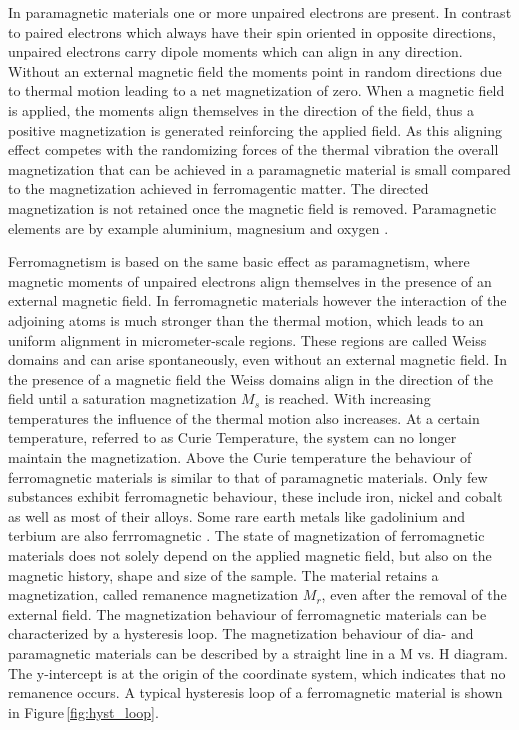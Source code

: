 In paramagnetic materials one or more unpaired electrons are present. In contrast to paired electrons which always have their spin oriented in opposite directions, unpaired electrons carry dipole moments which can align in any direction. Without an external magnetic field the moments point in random directions due to thermal motion leading to a net magnetization of zero. When a magnetic field is applied, the moments align themselves in the direction of the field, thus a positive magnetization is generated reinforcing the applied field. As this aligning effect competes with the randomizing forces of the thermal vibration the overall magnetization that can be achieved in a paramagnetic material is small compared to the magnetization achieved in ferromagentic matter. The directed magnetization is not retained once the magnetic field is removed. Paramagnetic elements are by example aluminium, magnesium and oxygen \cite{svoboda2004magnetic,griffiths2011elektrodynamik}.

Ferromagnetism is based on the same basic effect as paramagnetism, where magnetic moments of unpaired electrons align themselves in the presence of an external magnetic field. In ferromagnetic materials however the interaction of the adjoining atoms is much stronger than the thermal motion, which leads to an uniform alignment in micrometer-scale regions. These regions are called Weiss domains and can arise spontaneously, even without an external magnetic field. In the presence of a magnetic field the Weiss domains align in the direction of the field until a saturation magnetization $M_{s}$ is reached. With increasing temperatures the influence of the thermal motion also increases. At a certain temperature, referred to as Curie Temperature, the system can no longer maintain the magnetization. Above the Curie temperature the behaviour of ferromagnetic materials is similar to that of paramagnetic materials. Only few substances exhibit ferromagnetic behaviour, these include iron, nickel and cobalt as well as most of their alloys. Some rare earth metals like gadolinium and terbium are also ferrromagnetic \cite{svoboda2004magnetic}. The state of magnetization of ferromagnetic materials does not solely depend on the applied magnetic field, but also on the magnetic history, shape and size of the sample. The material retains a magnetization, called remanence magnetization $M_{r}$, even after the removal of the external field. The magnetization behaviour of ferromagnetic materials can be characterized by a hysteresis loop. The magnetization behaviour of dia- and paramagnetic materials can be described by a straight line in a M vs. H diagram. The y-intercept is at the origin of the coordinate system, which indicates that no remanence occurs. A typical hysteresis loop of a ferromagnetic material is shown in Figure\,\ref{fig:hyst_loop}. 

